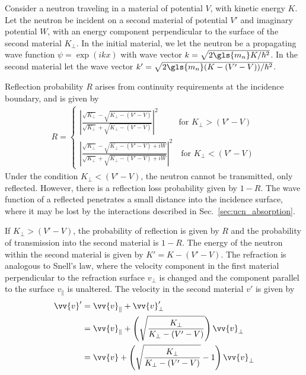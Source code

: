 
Consider a neutron traveling in a material of potential $V$, with kinetic energy $K$. Let the neutron be incident on a second material of potential $V'$ and imaginary potential $W$, with an energy component perpendicular to the surface of the second material $K_\perp$. In the initial material, we let the neutron be a propagating wave function $\psi = \exp (ikx)$ with wave vector $k=\sqrt{2\gls{m_n}K/\hbar^2}$. In the second material let the wave vector $k'=\sqrt{2\gls{m_n}(K-(V'-V))/\hbar^2}$.

Reflection probability $R$ arises from continuity requirements at the incidence boundary, and is given by~\cite{golubUCN, schreyer_thesis}
%
\begin{gather}
    R = \begin{cases}
        \left| \frac{\sqrt{K_\perp}-\sqrt{K_\perp - (V'-V)}}{\sqrt{K_\perp} + \sqrt{K_\perp - (V'-V)}}\right|^2 \hspace{30pt} \text{for } K_\perp > (V'-V) \\
        \left| \frac{\sqrt{K_\perp}-\sqrt{K_\perp - (V'-V) + iW}}{\sqrt{K_\perp} + \sqrt{K_\perp - (V'-V) + iW}} \right|^2 \quad \text{for } K_\perp < (V'-V) \label{eq:loss_on_reflection}
    \end{cases}
\end{gather}
%
Under the condition $K_\perp < (V'-V)$, the neutron cannot be transmitted, only reflected. However, there is a reflection loss probability given by $1-R$. The wave function of a reflected \ucn penetrates a small distance into the incidence surface, where it may be lost by the interactions described in Sec.~\ref{sec:ucn_absorption}.

If $K_\perp > (V'-V)$, the probability of reflection is given by $R$ and the probability of transmission into the second material is $1-R$. The energy of the neutron within the second material is given by $K'=K-(V'-V)$. The refraction is analogous to Snell's law, where the velocity component in the first material perpendicular to the refraction surface $v_\perp$ is changed and the component parallel to the surface $v_\parallel$ is unaltered. The velocity in the second material $v'$ is given by
%
\begin{align}
    \vv{v}' &= \vv{v}_\parallel+ \vv{v}'_\perp \\
    &= \vv{v}_\parallel + \left( \sqrt{\frac{K_\perp}{K_\perp - (V'-V)}} \right)\vv{v}_\perp \\
    &= \vv{v} + \left( \sqrt{\frac{K_\perp}{K_\perp - (V'-V)}} - 1 \right)\vv{v}_\perp
\end{align}

